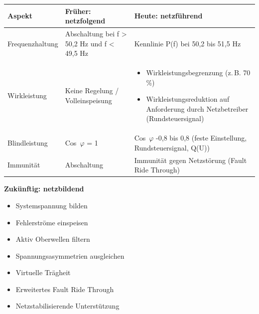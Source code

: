 \begin{tabular}{|l|p{3cm}|p{3.8cm}|}
\hline
\textbf{Aspekt} & \textbf{Früher: netzfolgend} & \textbf{Heute: netzführend}  \\
\hline
Frequenzhaltung & Abschaltung bei f > 50{,}2 Hz und f < 49{,}5 Hz & Kennlinie P(f) bei 50{,}2 bis 51{,}5 Hz  
 \\
\hline
Wirkleistung & Keine Regelung / Volleinspeisung & 
\begin{itemize}
  \item Wirkleistungsbegrenzung (z.\,B. 70\,\%)
  \item Wirkleistungsreduktion auf Anforderung durch Netzbetreiber (Rundsteuersignal)
\end{itemize} \\
\hline
Blindleistung & Cos~$\varphi$ = 1 & Cos~$\varphi$ -0{,}8 bis 0{,}8 (feste Einstellung, Rundsteuersignal, Q(U))  \\
\hline
Immunität & Abschaltung & Immunität gegen Netzstörung (Fault Ride Through)  \\
\hline
\end{tabular}

\vspace{0.1cm}

\textbf{Zukünftig: netzbildend}

\begin{minipage}[t]{0.48\columnwidth}
\begin{itemize}
  \item Systemspannung bilden
  \item Fehlerströme einspeisen
  \item Aktiv Oberwellen filtern
  \item Spannungsasymmetrien ausgleichen
\end{itemize}
\end{minipage}
\hfill
\begin{minipage}[t]{0.48\columnwidth}
\begin{itemize}
  \item Virtuelle Trägheit
  \item Erweitertes Fault Ride Through
  \item Netzstabilisierende Unterstützung
\end{itemize}
\end{minipage}